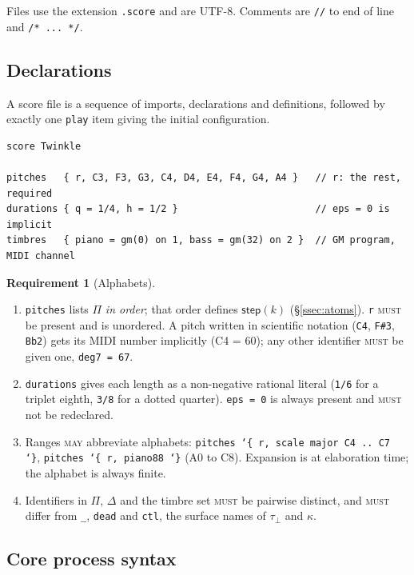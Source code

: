 \documentclass[11pt,a4paper]{article}
\theoremstyle{definition}
\newtheorem{requirement}{Requirement}[section]
\theoremstyle{remark}
\newcommand{\Pit}{\Pi}
\newcommand{\Dur}{\Delta}
\newcommand{\MUST}{\textsc{must}}
\newcommand{\MAY}{\textsc{may}}
\begin{document}
Files use the extension \texttt{.score} and are UTF-8. Comments are
\texttt{//} to end of line and \texttt{/* ... */}.

\subsection{Declarations}

A score file is a sequence of imports, declarations and definitions, followed by
exactly one \texttt{play} item giving the initial configuration.

\begin{lstlisting}[language=score]
score Twinkle

pitches   { r, C3, F3, G3, C4, D4, E4, F4, G4, A4 }   // r: the rest, required
durations { q = 1/4, h = 1/2 }                        // eps = 0 is implicit
timbres   { piano = gm(0) on 1, bass = gm(32) on 2 }  // GM program, MIDI channel
\end{lstlisting}

\begin{requirement}[Alphabets]\label{req:alph}
\begin{enumerate}[label=(\roman*),itemsep=1pt]
\item \texttt{pitches} lists $\Pit$ \emph{in order}; that order defines
  $\mathsf{step}(k)$ (\S\ref{ssec:atoms}). \texttt{r} \MUST{} be present and is
  unordered. A pitch written in scientific notation (\texttt{C4}, \texttt{F\#3},
  \texttt{Bb2}) gets its MIDI number implicitly (C4 = 60); any other identifier
  \MUST{} be given one, \texttt{deg7 = 67}.
\item \texttt{durations} gives each length as a non-negative rational literal
  (\texttt{1/6} for a triplet eighth, \texttt{3/8} for a dotted quarter).
  \texttt{eps = 0} is always present and \MUST{} not be redeclared.
\item Ranges \MAY{} abbreviate alphabets: \texttt{pitches \char`\{ r, scale major C4
  .. C7 \char`\}}, \texttt{pitches \char`\{ r, piano88 \char`\}} (A0 to C8). Expansion is at
  elaboration time; the alphabet is always finite.
\item Identifiers in $\Pit$, $\Dur$ and the timbre set \MUST{} be pairwise
  distinct, and \MUST{} differ from \texttt{\_}, \texttt{dead} and
  \texttt{ctl}, the surface names of $\tau_\bot$ and $\kappa$.
\end{enumerate}
\end{requirement}

\subsection{Core process syntax}
\end{document}
